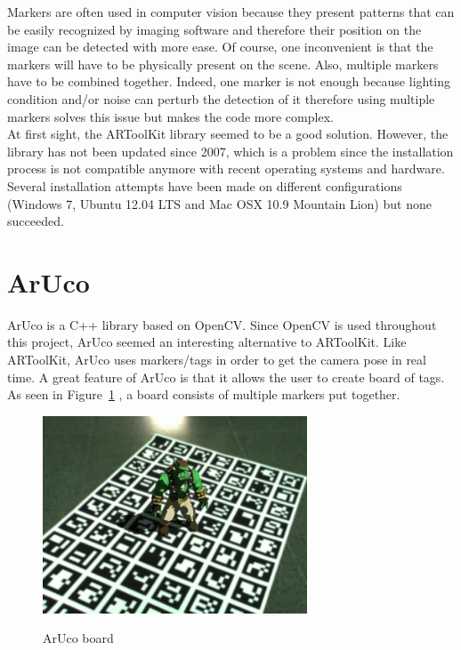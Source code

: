 Markers are often used in computer vision because they present patterns that can be easily recognized by imaging software and therefore their position on the image can be detected with more ease. Of course, one inconvenient is that the markers will have to be physically present on the scene. Also, multiple markers have to be combined together. Indeed, one marker is not enough because lighting condition and/or noise can perturb the detection of it therefore using multiple markers solves this issue but makes the code more complex.\\

At first sight, the ARToolKit library seemed to be a good solution. However, the library has not been updated since 2007, which is a problem since the installation process is not compatible anymore with recent operating systems and hardware. Several installation attempts have been made on different configurations (Windows 7, Ubuntu 12.04 LTS and Mac OSX 10.9 Mountain Lion) but none succeeded.\\


\section{ArUco}
ArUco is a C++ library based on OpenCV. Since OpenCV is used throughout this project, ArUco seemed an interesting alternative to ARToolKit. Like ARToolKit, ArUco uses markers/tags in order to get the camera pose in real time. A great feature of ArUco is that it allows the user to create board of tags. As seen in Figure~\ref{fig:board} \cite{aruco}, a board consists of multiple markers put together.\\

\begin{figure}
\caption{ArUco board}
\centering
    \includegraphics[width=0.7\textwidth]{images/board.jpg}
\label{fig:board}
\end{figure}

